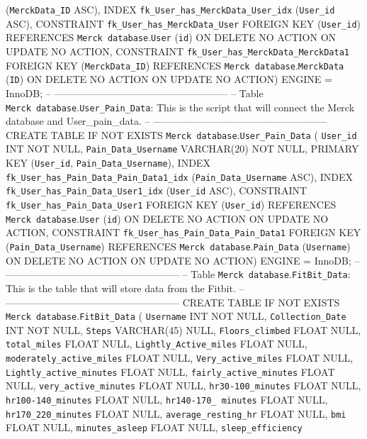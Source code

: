 \documentclass[]{book}
\begin{document}
(\texttt{MerckData\_ID} ASC), INDEX
\texttt{fk\_User\_has\_MerckData\_User\_idx} (\texttt{User\_id} ASC),
CONSTRAINT \texttt{fk\_User\_has\_MerckData\_User} FOREIGN KEY
(\texttt{User\_id}) REFERENCES \texttt{Merck\ database}.\texttt{User}
(\texttt{id}) ON DELETE NO ACTION ON UPDATE NO ACTION, CONSTRAINT
\texttt{fk\_User\_has\_MerckData\_MerckData1} FOREIGN KEY
(\texttt{MerckData\_ID}) REFERENCES
\texttt{Merck\ database}.\texttt{MerckData} (\texttt{ID}) ON DELETE NO
ACTION ON UPDATE NO ACTION) ENGINE = InnoDB; --
----------------------------------------------------- -- Table
\texttt{Merck\ database}.\texttt{User\_Pain\_Data}: This is the script
that will connect the Merck database and User\_pain\_data. --
----------------------------------------------------- CREATE TABLE IF
NOT EXISTS \texttt{Merck\ database}.\texttt{User\_Pain\_Data} (
\texttt{User\_id} INT NOT NULL, \texttt{Pain\_Data\_Username}
VARCHAR(20) NOT NULL, PRIMARY KEY (\texttt{User\_id},
\texttt{Pain\_Data\_Username}), INDEX
\texttt{fk\_User\_has\_Pain\_Data\_Pain\_Data1\_idx}
(\texttt{Pain\_Data\_Username} ASC), INDEX
\texttt{fk\_User\_has\_Pain\_Data\_User1\_idx} (\texttt{User\_id} ASC),
CONSTRAINT \texttt{fk\_User\_has\_Pain\_Data\_User1} FOREIGN KEY
(\texttt{User\_id}) REFERENCES \texttt{Merck\ database}.\texttt{User}
(\texttt{id}) ON DELETE NO ACTION ON UPDATE NO ACTION, CONSTRAINT
\texttt{fk\_User\_has\_Pain\_Data\_Pain\_Data1} FOREIGN KEY
(\texttt{Pain\_Data\_Username}) REFERENCES
\texttt{Merck\ database}.\texttt{Pain\_Data} (\texttt{Username}) ON
DELETE NO ACTION ON UPDATE NO ACTION) ENGINE = InnoDB; --
----------------------------------------------------- -- Table
\texttt{Merck\ database}.\texttt{FitBit\_Data}: This is the table that
will store data from the Fitbit. --
----------------------------------------------------- CREATE TABLE IF
NOT EXISTS \texttt{Merck\ database}.\texttt{FitBit\_Data} (
\texttt{Username} INT NOT NULL, \texttt{Collection\_Date} INT NOT NULL,
\texttt{Steps} VARCHAR(45) NULL, \texttt{Floors\_climbed} FLOAT NULL,
\texttt{total\_miles} FLOAT NULL, \texttt{Lightly\_Active\_miles} FLOAT
NULL, \texttt{moderately\_active\_miles} FLOAT NULL,
\texttt{Very\_active\_miles} FLOAT NULL,
\texttt{Lightly\_active\_minutes} FLOAT NULL,
\texttt{fairly\_active\_minutes} FLOAT NULL,
\texttt{very\_active\_minutes} FLOAT NULL, \texttt{hr30-100\_minutes}
FLOAT NULL, \texttt{hr100-140\_minutes} FLOAT NULL,
\texttt{hr140-170\_\ minutes} FLOAT NULL, \texttt{hr170\_220\_minutes}
FLOAT NULL, \texttt{average\_resting\_hr} FLOAT NULL, \texttt{bmi} FLOAT
NULL, \texttt{minutes\_asleep} FLOAT NULL, \texttt{sleep\_efficiency}
\end{document}
